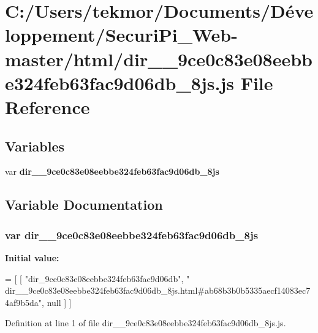 \section{C\+:/\+Users/tekmor/\+Documents/\+Développement/\+Securi\+Pi\+\_\+\+Web-\/master/html/dir\+\_\+\+\_\+9ce0c83e08eebbe324feb63fac9d06db\+\_\+8js.js File Reference}
\label{dir____9ce0c83e08eebbe324feb63fac9d06db__8js_8js}
\subsection*{Variables}
\begin{DoxyCompactItemize}
\item 
var {\bf dir\+\_\+\+\_\+9ce0c83e08eebbe324feb63fac9d06db\+\_\+8js}
\end{DoxyCompactItemize}


\subsection{Variable Documentation}
\subsubsection[{dir\+\_\+\+\_\+9ce0c83e08eebbe324feb63fac9d06db\+\_\+8js}]{\setlength{\rightskip}{0pt plus 5cm}var dir\+\_\+\+\_\+9ce0c83e08eebbe324feb63fac9d06db\+\_\+8js}\label{dir____9ce0c83e08eebbe324feb63fac9d06db__8js_8js_a93e7926d1af58354a23b92f46497ed01}
{\bfseries Initial value\+:}
\begin{DoxyCode}
=
[
    [ \textcolor{stringliteral}{"dir\_9ce0c83e08eebbe324feb63fac9d06db"}, \textcolor{stringliteral}{"
      dir\_\_9ce0c83e08eebbe324feb63fac9d06db\_8js.html#ab68b3b0b5335aecf14083ec74af9b5da"}, null ]
]
\end{DoxyCode}


Definition at line 1 of file dir\+\_\+\+\_\+9ce0c83e08eebbe324feb63fac9d06db\+\_\+8js.\+js.

